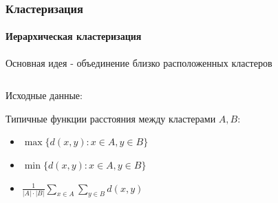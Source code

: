\documentclass[xcolor=table]{beamer}
\begin{document}
\begin{frame}
  \frametitle{Кластеризация}
  \framesubtitle{Иерархическая кластеризация}

  \begin{center}
    Основная идея - объединение близко расположенных кластеров
  \end{center}

  \begin{columns}
    \begin{column}{0.5\textwidth}
      Исходные данные:

      Типичные функции расстояния между кластерами $A, B$:
      \begin{itemize}
      \item $\max\{d(x, y): x \in A, y \in B\}$
      \item $\min\{d(x, y): x \in A, y \in B\}$
      \item $\frac{1}{|A| \cdot |B|} \sum_{x \in A}\sum_{y \in B}d(x, y)$
      \end{itemize}
    \end{column}


\end{columns}
\end{frame}
\end{document}
